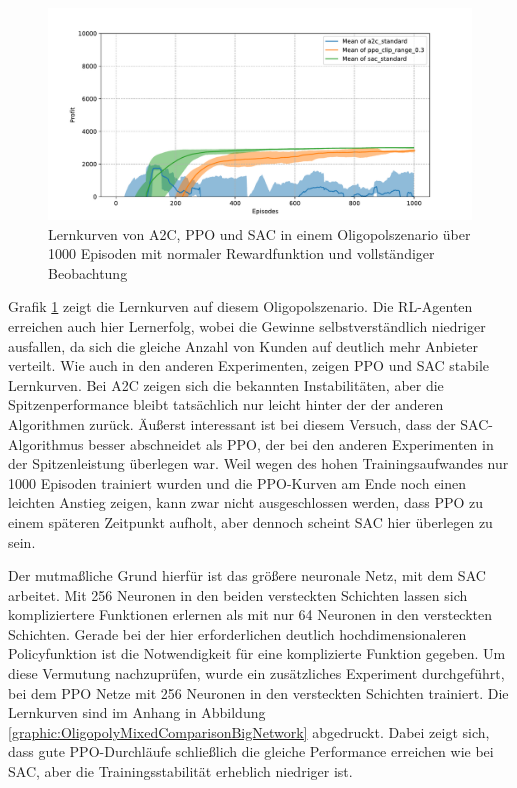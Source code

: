 \begin{figure}[htb]
	\centering
	\includegraphics[width=\textwidth]{main/comparison_oligopoly.pdf}
	\caption{Lernkurven von A2C, PPO und SAC in einem Oligopolszenario über 1000 Episoden mit normaler Rewardfunktion und vollständiger Beobachtung}
	\label{graphic:OligopolyComparison}
\end{figure}

Grafik \ref{graphic:OligopolyComparison} zeigt die Lernkurven auf diesem Oligopolszenario.
Die RL-Agenten erreichen auch hier Lernerfolg, wobei die Gewinne selbstverständlich niedriger ausfallen, da sich die gleiche Anzahl von Kunden auf deutlich mehr Anbieter verteilt.
Wie auch in den anderen Experimenten, zeigen PPO und SAC stabile Lernkurven.
Bei A2C zeigen sich die bekannten Instabilitäten, aber die Spitzenperformance bleibt tatsächlich nur leicht hinter der der anderen Algorithmen zurück.
Äußerst interessant ist bei diesem Versuch, dass der SAC-Algorithmus besser abschneidet als PPO, der bei den anderen Experimenten in der Spitzenleistung überlegen war.
Weil wegen des hohen Trainingsaufwandes nur 1000 Episoden trainiert wurden und die PPO-Kurven am Ende noch einen leichten Anstieg zeigen, kann zwar nicht ausgeschlossen werden, dass PPO zu einem späteren Zeitpunkt aufholt, aber dennoch scheint SAC hier überlegen zu sein.

Der mutmaßliche Grund hierfür ist das größere neuronale Netz, mit dem SAC arbeitet.
Mit 256 Neuronen in den beiden versteckten Schichten lassen sich kompliziertere Funktionen erlernen als mit nur 64 Neuronen in den versteckten Schichten.
Gerade bei der hier erforderlichen deutlich hochdimensionaleren Policyfunktion ist die Notwendigkeit für eine komplizierte Funktion gegeben.
Um diese Vermutung nachzuprüfen, wurde ein zusätzliches Experiment durchgeführt, bei dem PPO Netze mit 256 Neuronen in den versteckten Schichten trainiert.
Die Lernkurven sind im Anhang in Abbildung \ref{graphic:OligopolyMixedComparisonBigNetwork} abgedruckt.
Dabei zeigt sich, dass gute PPO-Durchläufe schließlich die gleiche Performance erreichen wie bei SAC, aber die Trainingsstabilität erheblich niedriger ist.

